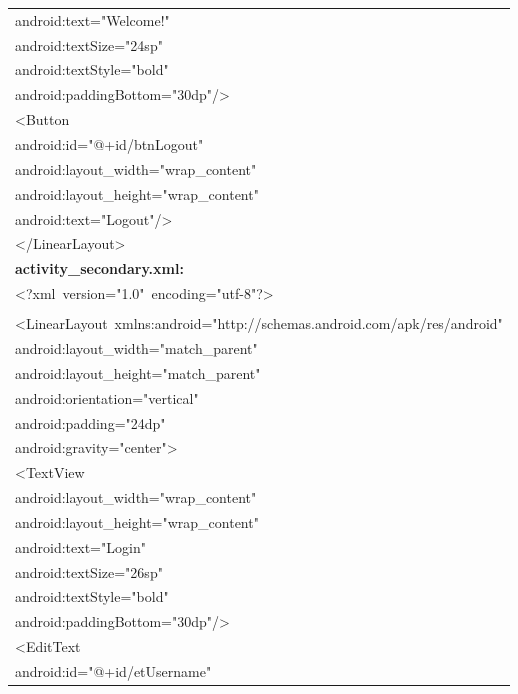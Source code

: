 \documentclass[a4paper,12pt]{article}
\begin{document}
\begin{longtable}{|p{}|}
{\ttfamily\small android:text="Welcome!"} \\
{\ttfamily\small android:textSize="24sp"} \\
{\ttfamily\small android:textStyle="bold"} \\
{\ttfamily\small android:paddingBottom="30dp"/\textgreater{}} \\
{\ttfamily\small \textless{}Button} \\
{\ttfamily\small android:id="@+id/btnLogout"} \\
{\ttfamily\small android:layout\_width="wrap\_content"} \\
{\ttfamily\small android:layout\_height="wrap\_content"} \\
{\ttfamily\small android:text="Logout"/\textgreater{}} \\
{\ttfamily\small \textless{}/LinearLayout\textgreater{}} \\
\hline
\rule{0pt}{13pt}\textbf{activity\_secondary.xml:} \\
\hline
{\ttfamily\small \textless{}?xml\ version="1.0"\ encoding="utf-8"?\textgreater{}} \\
\strut \\
{\ttfamily\small \textless{}LinearLayout\ xmlns:android="http://schemas.android.com/apk/res/android"} \\
{\ttfamily\small android:layout\_width="match\_parent"} \\
{\ttfamily\small android:layout\_height="match\_parent"} \\
{\ttfamily\small android:orientation="vertical"} \\
{\ttfamily\small android:padding="24dp"} \\
{\ttfamily\small android:gravity="center"\textgreater{}} \\
{\ttfamily\small \textless{}TextView} \\
{\ttfamily\small android:layout\_width="wrap\_content"} \\
{\ttfamily\small android:layout\_height="wrap\_content"} \\
{\ttfamily\small android:text="Login"} \\
{\ttfamily\small android:textSize="26sp"} \\
{\ttfamily\small android:textStyle="bold"} \\
{\ttfamily\small android:paddingBottom="30dp"/\textgreater{}} \\
{\ttfamily\small \textless{}EditText} \\
{\ttfamily\small android:id="@+id/etUsername"} \\

\end{longtable}
\end{document}
